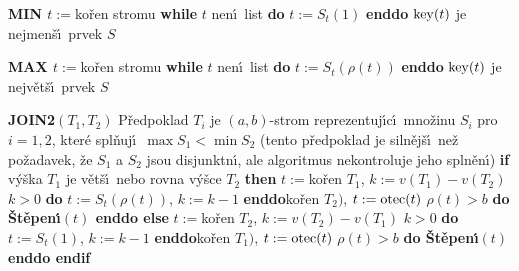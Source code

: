 {\bf MIN\newline 
$t:=$}ko\v ren stromu\newline 
{\bf while} $t$ nen\'\i\ list {\bf do} $t:=S_t(1)$ {\bf enddo}\newline 
$\operatorname{key}(t)$ je nejmen\v s\'\i\ prvek $S$
\medskip

{\bf MAX\newline 
$t:=$}ko\v ren stromu\newline 
{\bf while} $t$ nen\'\i\ list {\bf do} $t:=S_t(\rho (t))$ {\bf enddo}\newline 
$\operatorname{key}(t)$ je nejv\v et\v s\'\i\ prvek $S$
\medskip

{\bf JOIN2$(T_1,T_2)$}\newline
P\v redpoklad $T_i$ je $(a,b)$-strom reprezentuj\'\i c\'\i\ 
mno\v zinu $S_i$ pro $i=1,2$, kter\'e spl\v nuj\'\i\ $\max S_1<\min 
S_2$ 
(tento p\v redpoklad je siln\v ej\v s\'\i\ ne\v z po\v zadavek, \v ze $
S_1$ a 
$S_2$ jsou disjunktn\'\i , ale algoritmus nekontroluje jeho spln\v en\'\i )\newline 
{\bf if} v\'y\v ska $T_1$ je v\v et\v s\'\i\ nebo rovna v\'y\v sce $T_2$ {\bf then}\newline 
\phantom{---}$t:=$ko\v ren $T_1$, $k:=v(T_1)-v(T_2)$\newline 
\phantom{---}{\bf while} $k>0$ {\bf do} $t:=S_t(\rho (t))$, $k:=k-1$ {\bf enddo}\newline \phantom{---}{\bf Spojen\'\i$(t,$}ko\v ren $T_2)$, $t:=\operatorname{otec}(t)$\newline 
\phantom{---}{\bf while} $\rho (t)>b$ {\bf do \v St\v epen\'\i$(t)$ enddo\newline 
else}\newline 
\phantom{---}$t:=$ko\v ren $T_2$, $k:=v(T_2)-v(T_1)$ \newline 
\phantom{---}{\bf while} $k>0$ {\bf do} $t:=S_t(1)$, $k:=k-1$ {\bf enddo}\newline \phantom{---}{\bf Spojen\'\i$(t,$}ko\v ren $T_1)$, $t:=\operatorname{otec}(t)$\newline 
\phantom{---}{\bf while} $\rho (t)>b$ {\bf do \v St\v epen\'\i$(t)$ enddo\newline 
endif}
\medskip

